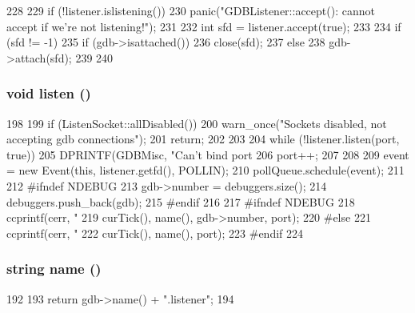 \begin{DoxyCode}
228 {
229     if (!listener.islistening())
230         panic("GDBListener::accept(): cannot accept if we're not listening!");
231 
232     int sfd = listener.accept(true);
233 
234     if (sfd != -1) {
235         if (gdb->isattached())
236             close(sfd);
237         else
238             gdb->attach(sfd);
239     }
240 }
\end{DoxyCode}
\hypertarget{classGDBListener_a458bbe4cf81360301586b2e62a7f9dd2}{
\subsubsection[{listen}]{\setlength{\rightskip}{0pt plus 5cm}void listen ()}}
\label{classGDBListener_a458bbe4cf81360301586b2e62a7f9dd2}



\begin{DoxyCode}
198 {
199     if (ListenSocket::allDisabled()) {
200         warn_once("Sockets disabled, not accepting gdb connections");
201         return;
202     }
203 
204     while (!listener.listen(port, true)) {
205         DPRINTF(GDBMisc, "Can't bind port %
206         port++;
207     }
208 
209     event = new Event(this, listener.getfd(), POLLIN);
210     pollQueue.schedule(event);
211 
212 #ifndef NDEBUG
213     gdb->number = debuggers.size();
214     debuggers.push_back(gdb);
215 #endif
216 
217 #ifndef NDEBUG
218     ccprintf(cerr, "%
219              curTick(), name(), gdb->number, port);
220 #else
221     ccprintf(cerr, "%
222              curTick(), name(), port);
223 #endif
224 }
\end{DoxyCode}
\hypertarget{classGDBListener_aa62b508d2c0e7d9cec12924965276eb5}{
\subsubsection[{name}]{\setlength{\rightskip}{0pt plus 5cm}string name ()}}
\label{classGDBListener_aa62b508d2c0e7d9cec12924965276eb5}



\begin{DoxyCode}
192 {
193     return gdb->name() + ".listener";
194 }
\end{DoxyCode}


